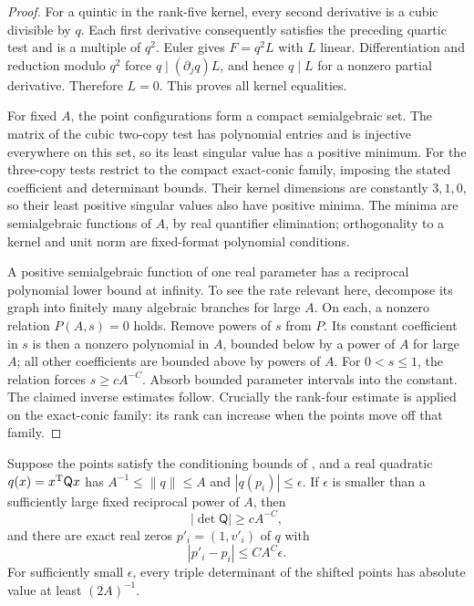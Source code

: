 \begin{proof}
For a quintic in the rank-five kernel, every second derivative
is a cubic divisible by \(q\). Each first derivative consequently
satisfies the preceding quartic test and is a multiple of \(q^2\).
Euler gives \(F=q^2L\) with \(L\) linear.
Differentiation and reduction modulo \(q^2\) force
\(q\mid(\partial_jq)L\), and hence \(q\mid L\) for a nonzero
partial derivative. Therefore \(L=0\).
This proves all kernel equalities.

For fixed \(A\), the point configurations form a compact
semialgebraic set. The matrix of the cubic two-copy test has
polynomial entries and is injective everywhere on this set,
so its least singular value has a positive minimum.
For the three-copy tests restrict to the compact exact-conic
family, imposing the stated coefficient and determinant bounds.
Their kernel dimensions are constantly \(3,1,0\), so their
least positive singular values also have positive minima.
The minima are semialgebraic functions of \(A\), by real
quantifier elimination; orthogonality to a kernel and unit norm
are fixed-format polynomial conditions.

A positive semialgebraic function of one real parameter has a
reciprocal polynomial lower bound at infinity.
To see the rate relevant here, decompose its graph into finitely
many algebraic branches for large \(A\). On each, a nonzero
relation \(P(A,s)=0\) holds. Remove powers of \(s\) from \(P\).
Its constant coefficient in \(s\) is then a nonzero polynomial
in \(A\), bounded below by a power of \(A\) for large \(A\);
all other coefficients are bounded above by powers of \(A\).
For \(0<s\leq1\), the relation forces \(s\geq cA^{-C}\).
Absorb bounded parameter intervals into the constant.
The claimed inverse estimates follow. Crucially the rank-four
estimate is applied on the exact-conic family: its rank can
increase when the points move off that family.
\end{proof}

\begin{lemma}
\label{a05:real-conic}
Suppose the points satisfy the conditioning bounds of
, and a real quadratic \(q(x)=x^{\rm T}
\mathsf Qx\) has
\(A^{-1}\leq\|q\|\leq A\) and \(|q(p_i)|\leq\epsilon\).
If \(\epsilon\) is smaller than a sufficiently large fixed
reciprocal power of \(A\), then
\[
 |\det\mathsf Q|\geq cA^{-C},
\]
and there are exact real zeros \(p'_i=(1,v'_i)\) of \(q\) with
\[
 |p'_i-p_i|\leq CA^C\epsilon.
\]
For sufficiently small \(\epsilon\), every triple determinant
of the shifted points has absolute value at least \((2A)^{-1}\).
\end{lemma}

